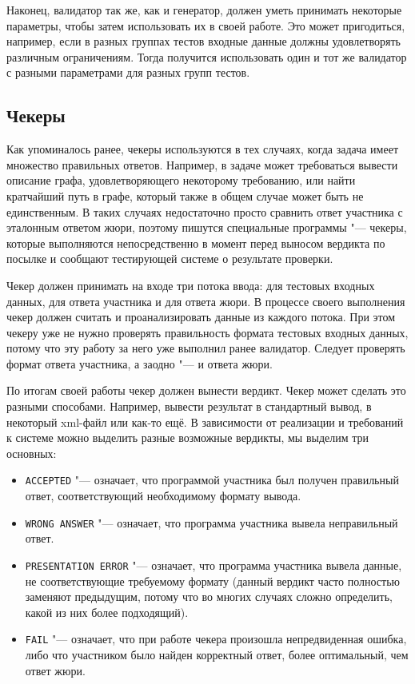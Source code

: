 Наконец, валидатор так же, как и генератор, должен уметь принимать некоторые параметры, чтобы затем использовать их в своей работе. Это может пригодиться, например, если в разных группах тестов входные данные должны удовлетворять различным ограничениям. Тогда получится использовать один и тот же валидатор с разными параметрами для разных групп тестов.

\subsection{Чекеры}

Как упоминалось ранее, чекеры используются в тех случаях, когда задача имеет множество правильных ответов. Например, в задаче может требоваться вывести описание графа, удовлетворяющего некоторому требованию, или найти кратчайший путь в графе, который также в общем случае может быть не единственным. В таких случаях недостаточно просто сравнить ответ участника с эталонным ответом жюри, поэтому пишутся специальные программы "--- чекеры, которые выполняются непосредственно в момент перед выносом вердикта по посылке и сообщают тестирующей системе о результате проверки.

Чекер должен принимать на входе три потока ввода: для тестовых входных данных, для ответа участника и для ответа жюри. В процессе своего выполнения чекер должен считать и проанализировать данные из каждого потока. При этом чекеру уже не нужно проверять правильность формата тестовых входных данных, потому что эту работу за него уже выполнил ранее валидатор. Следует проверять формат ответа участника, а заодно "--- и ответа жюри.

По итогам своей работы чекер должен вынести вердикт. Чекер может сделать это разными способами. Например, вывести результат в стандартный вывод, в некоторый xml-файл или как-то ещё. В зависимости от реализации и требований к системе можно выделить разные возможные вердикты, мы выделим три основных:

\begin{itemize}
\item \texttt{ACCEPTED} "--- означает, что программой участника был получен правильный ответ, соответствующий необходимому формату вывода.
\item \texttt{WRONG ANSWER} "--- означает, что программа участника вывела неправильный ответ.
\item \texttt{PRESENTATION ERROR} "--- означает, что программа участника вывела данные, не соответствующие требуемому формату (данный вердикт часто полностью заменяют предыдущим, потому что во многих случаях сложно определить, какой из них более подходящий).
\item \texttt{FAIL} "--- означает, что при работе чекера произошла непредвиденная ошибка, либо что участником было найден корректный ответ, более оптимальный, чем ответ жюри.
\end{itemize}

